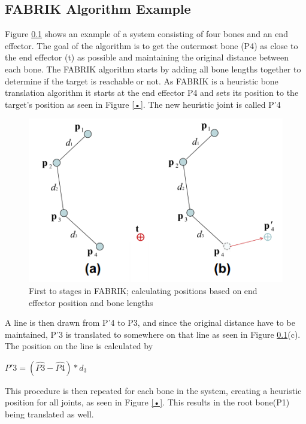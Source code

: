 \subsection{FABRIK Algorithm Example}

Figure \ref{} shows an example of a system consisting of four bones and an end effector. The goal of the algorithm is to get the outermost bone (P4) as close to the end effector (t) as possible and maintaining the original distance between each bone. 
The FABRIK algorithm starts by adding all bone lengths together to determine if the target is reachable or not. 
As FABRIK is a heuristic bone translation algorithm it starts at the end effector P4 and sets its position to the target's position as seen in Figure \ref{•}. The new heuristic joint is called P'4 

\begin{figure}[hbtp]
\centering
\includegraphics[width=\textwidth]{ab.PNG}
\caption{First to stages in FABRIK; calculating positions based on end effector position and bone lengths}
\end{figure}

A line is then drawn from P'4 to P3, and since the original distance have to be maintained, P'3 is translated to somewhere on that line as seen in Figure \ref{}(c). The position on the line is calculated by 

$P'3 = (\hat{P3} - \hat{P4}) * d_{3}$

This procedure is then repeated for each bone in the system, creating a heuristic position for all joints, as seen in Figure \ref{•}. This results in the root bone(P1) being translated as well. 

